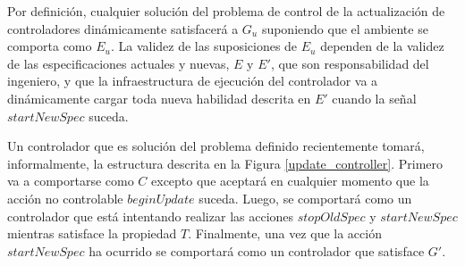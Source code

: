 Por definición, cualquier solución del problema de control de la actualización de controladores dinámicamente
satisfacerá a $G_u$ suponiendo que el ambiente se comporta como $E_u$. La validez de las suposiciones de $E_u$ dependen de
la validez de las especificaciones actuales y nuevas, $E$ y $E'$, que son responsabilidad del ingeniero, y que la
infraestructura de ejecución del controlador va a dinámicamente cargar toda nueva habilidad descrita en $E'$ cuando
la señal $startNewSpec$ suceda.

Un controlador que es solución del problema definido recientemente tomará, informalmente, la estructura descrita en la
Figura \ref{update_controller}. Primero va a comportarse como $C$ excepto que aceptará en cualquier momento que la acción no controlable
$beginUpdate$ suceda. Luego, se comportará como un controlador que está intentando realizar las acciones $stopOldSpec$ y
$startNewSpec$ mientras satisface la propiedad $T$. Finalmente, una vez que la acción $startNewSpec$ ha ocurrido se
comportará como un controlador que satisface $G'$.



